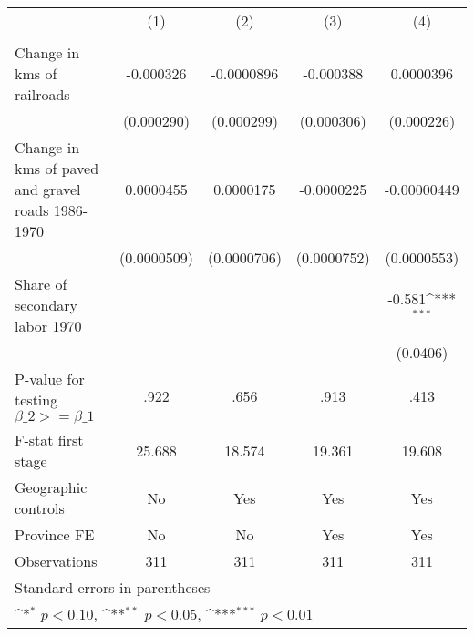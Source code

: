 {
\def\sym#1{\ifmmode^{#1}\else\(^{#1}\)\fi}
\begin{tabular}{l*{4}{c}}
\hline\hline
                &\multicolumn{1}{c}{(1)}&\multicolumn{1}{c}{(2)}&\multicolumn{1}{c}{(3)}&\multicolumn{1}{c}{(4)}\\
                &\multicolumn{1}{c}{}&\multicolumn{1}{c}{}&\multicolumn{1}{c}{}&\multicolumn{1}{c}{}\\
\hline
Change in kms of railroads&-0.000326         &-0.0000896         &-0.000388         &0.0000396         \\
                &(0.000290)         &(0.000299)         &(0.000306)         &(0.000226)         \\
[1em]
Change in kms of paved and gravel roads 1986-1970&0.0000455         &0.0000175         &-0.0000225         &-0.00000449         \\
                &(0.0000509)         &(0.0000706)         &(0.0000752)         &(0.0000553)         \\
[1em]
Share of secondary labor 1970&                  &                  &                  &   -0.581\sym{***}\\
                &                  &                  &                  & (0.0406)         \\
\hline
P-value for testing $\beta\_{2} >= \beta\_{1}$&     .922         &     .656         &     .913         &     .413         \\
F-stat first stage&   25.688         &   18.574         &   19.361         &   19.608         \\
Geographic controls&       No         &      Yes         &      Yes         &      Yes         \\
Province FE     &       No         &       No         &      Yes         &      Yes         \\
Observations    &      311         &      311         &      311         &      311         \\
\hline\hline
\multicolumn{5}{l}{\footnotesize Standard errors in parentheses}\\
\multicolumn{5}{l}{\footnotesize \sym{*} \(p<0.10\), \sym{**} \(p<0.05\), \sym{***} \(p<0.01\)}\\
\end{tabular}
}
